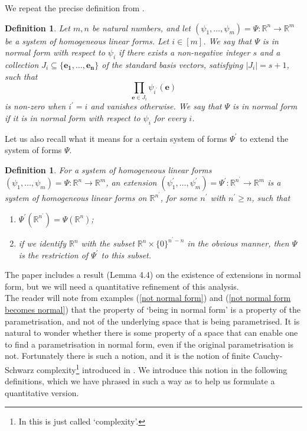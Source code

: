 \documentclass[12pt,a4paper,twoside,reqno]{amsart}
\newtheorem{Definition}[Theorem]{Definition}
\numberwithin{equation}{section}
\begin{document}
We repeat the precise definition from \cite{GT10}.

\begin{Definition}
\label{Definition normal form}
Let $m,n$ be natural numbers, and let $(\psi_1,\dots,\psi_m) = \Psi:\mathbb{R}^n\longrightarrow \mathbb{R}^m$ be a system of homogeneous linear forms. Let $i\in [m]$. We say that $\Psi$ is in normal form with respect to $\psi_i$ if there exists a non-negative integer $s$ and a collection $J_i \subseteq \{ \mathbf{e_1},\dots,\mathbf{e_n}\}$ of the standard basis vectors, satisfying $\vert J_i\vert = s+1$, such that $$\prod\limits_{\mathbf{e}\in J_i} \psi_{i^\prime}(\mathbf{e})$$ is non-zero when $i^\prime = i$ and vanishes otherwise. We say that $\Psi$ is in normal form if it is in normal form with respect to $\psi_i$ for every $i$. 
\end{Definition}
\noindent Let us also recall what it means for a certain system of forms $\Psi^\prime$ to extend the system of forms $\Psi$.
\begin{Definition}
For a system of homogeneous linear forms $(\psi_1,\dots,\psi_m) = \Psi:\mathbb{R}^n\longrightarrow \mathbb{R}^m$, an extension $(\psi_1^\prime,\dots,\psi_m^\prime) = \Psi^\prime: \mathbb{R}^{n^\prime} \longrightarrow \mathbb{R}^m$ is a system of homogeneous linear forms on $\mathbb{R}^{n^\prime}$, for some $n^\prime$ with $n^\prime\geqslant n$, such that 
\begin{enumerate}[(1)]
\item $\Psi^\prime(\mathbb{R}^{n^\prime}) = \Psi(\mathbb{R}^n)$;
\item if we identify $\mathbb{R}^n$ with the subset $\mathbb{R}^{n}\times \{ 0\}^{n^\prime - n}$ in the obvious manner, then $\Psi$ is the restriction of $\Psi^\prime$ to this subset.
\end{enumerate}
\end{Definition}
\noindent The paper \cite{GT10} includes a result (Lemma 4.4) on the existence of extensions in normal form, but we will need a quantitative refinement of this analysis.\\

The reader will note from examples (\ref{not normal form}) and (\ref{not normal form becomes normal}) that the property of `being in normal form' is a property of the parametrisation, and not of the underlying space that is being parametrised. It is natural to wonder whether there is some property of a space that can enable one to find a parametrisation in normal form, even if the original parametrisation is not. Fortunately there is such a notion, and it is the notion of finite Cauchy-Schwarz complexity\footnote{In \cite{GT10} this is just called `complexity'.}  introduced in \cite{GT10}. We introduce this notion in the following definitions, which we have phrased in such a way as to help us formulate a quantitative version.
\end{document}
